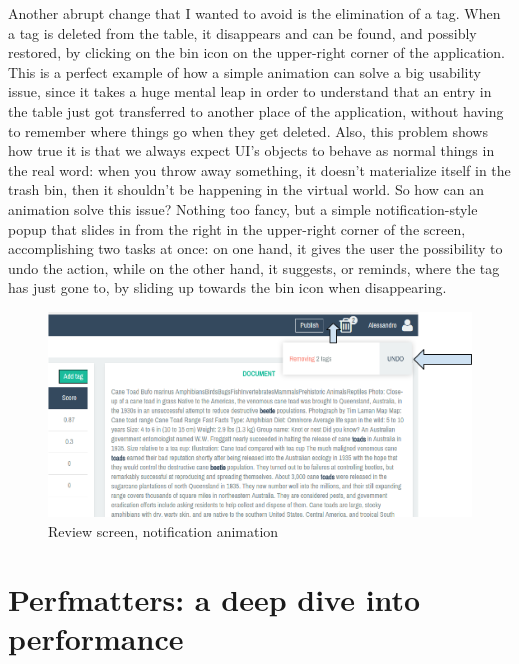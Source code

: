 \documentclass[12pt,oneside,svgnames]{memoir}
\begin{document}
Another abrupt change that I wanted to avoid is the elimination of a
tag. When a tag is deleted from the table, it disappears and can be
found, and possibly restored, by clicking on the bin icon on the
upper-right corner of the application. This is a perfect example of how
a simple animation can solve a big usability issue, since it takes a
huge mental leap in order to understand that an entry in the table just
got transferred to another place of the application, without having to
remember where things go when they get deleted. Also, this problem shows
how true it is that we always expect UI's objects to behave as normal
things in the real word: when you throw away something, it doesn't
materialize itself in the trash bin, then it shouldn't be happening in
the virtual world. So how can an animation solve this issue? Nothing too
fancy, but a simple notification-style popup that slides in from the
right in the upper-right corner of the screen, accomplishing two tasks
at once: on one hand, it gives the user the possibility to undo the
action, while on the other hand, it suggests, or reminds, where the tag
has just gone to, by sliding up towards the bin icon when disappearing.

\begin{figure}[htbp]
\centering
\includegraphics{./src/img/review-notification-animation.png}
\caption{Review screen, notification animation}
\end{figure}

\chapter{Perfmatters: a deep dive into
performance}\label{perfmatters-a-deep-dive-into-performance}
\end{document}
